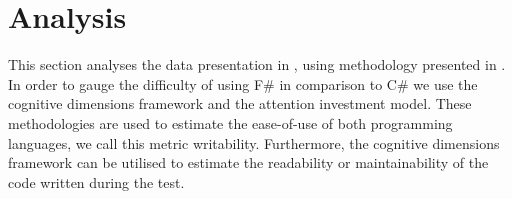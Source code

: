 \section{Analysis}
This section analyses the data presentation in , using methodology presented in . In order to gauge the difficulty of using F\# in comparison to C\# we use the cognitive dimensions framework and the attention investment model. These methodologies are used to estimate the ease-of-use of both programming languages, we call this metric writability. Furthermore, the cognitive dimensions framework can be utilised to estimate the readability or maintainability of the code written during the test.





